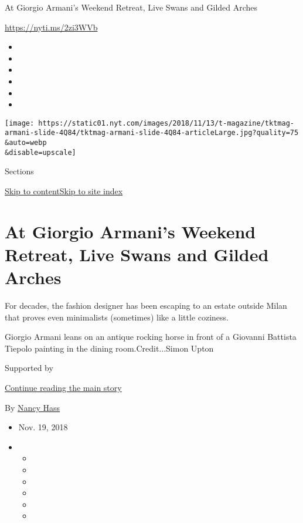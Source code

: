 At Giorgio Armani's Weekend Retreat, Live Swans and Gilded Arches

\href{https://nyti.ms/2zi3WVb}{https://nyti.ms/2zi3WVb}

\begin{itemize}
\item
\item
\item
\item
\item
\item
\end{itemize}

\texttt{[image: https://static01.nyt.com/images/2018/11/13/t-magazine/tktmag-armani-slide-4Q84/tktmag-armani-slide-4Q84-articleLarge.jpg?quality=75\\\&auto=webp\\\&disable=upscale]}

Sections

\protect\hyperlink{site-content}{Skip to
content}\protect\hyperlink{site-index}{Skip to site index}

\hypertarget{at-giorgio-armanis-weekend-retreat-live-swans-and-gilded-arches}{%
\section{At Giorgio Armani's Weekend Retreat, Live Swans and Gilded
Arches}\label{at-giorgio-armanis-weekend-retreat-live-swans-and-gilded-arches}}

For decades, the fashion designer has been escaping to an estate outside
Milan that proves even minimalists (sometimes) like a little coziness.

Giorgio Armani leans on an antique rocking horse in front of a Giovanni
Battista Tiepolo painting in the dining room.Credit...Simon Upton

Supported by

\protect\hyperlink{after-sponsor}{Continue reading the main story}

By \href{https://www.nytimes.com/by/nancy-hass}{Nancy Hass}

\begin{itemize}
\item
  Nov. 19, 2018
\item
  \begin{itemize}
  \item
  \item
  \item
  \item
  \item
  \item
  \end{itemize}
\end{itemize}


